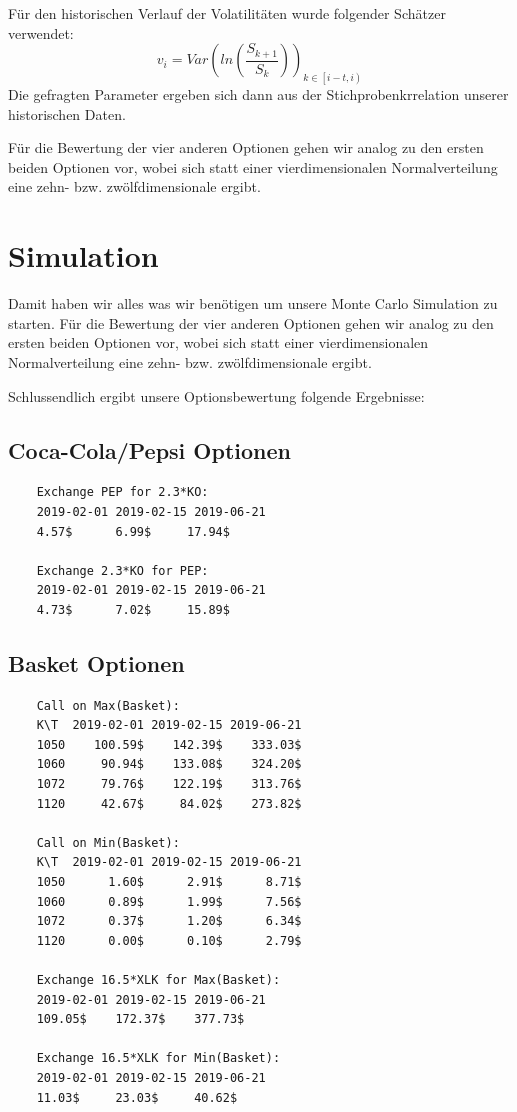 \documentclass[12pt]{article}
\begin{document}
	Für den historischen Verlauf der Volatilitäten wurde folgender Schätzer verwendet:
	\begin{equation*}
	v_i=Var\left(ln\left(\frac{S_{k+1}}{S_k}\right)\right)_{k\in\left[i-t,i\right)}
	\end{equation*}
	Die gefragten Parameter ergeben sich dann aus der Stichprobenkrrelation unserer historischen Daten.
	
	Für die Bewertung der vier anderen Optionen gehen wir analog zu den ersten beiden Optionen vor, wobei sich statt einer vierdimensionalen Normalverteilung eine zehn- bzw. zwölfdimensionale ergibt.
	
	
	
	\section*{Simulation}
	
	Damit haben wir alles was wir benötigen um unsere Monte Carlo Simulation zu starten.
	Für die Bewertung der vier anderen Optionen gehen wir analog zu den ersten beiden Optionen vor, wobei sich statt einer vierdimensionalen Normalverteilung eine zehn- bzw. zwölfdimensionale ergibt.
	
	
	
	Schlussendlich ergibt unsere Optionsbewertung folgende Ergebnisse:
	\subsection*{Coca-Cola/Pepsi Optionen}
	
	\begin{verbatim}
	Exchange PEP for 2.3*KO:
	2019-02-01 2019-02-15 2019-06-21
	4.57$      6.99$     17.94$ 
	
	Exchange 2.3*KO for PEP:
	2019-02-01 2019-02-15 2019-06-21
	4.73$      7.02$     15.89$
	\end{verbatim}
	
	
	\subsection*{Basket Optionen}
	
	
	
	\begin{verbatim}
	Call on Max(Basket):
	K\T  2019-02-01 2019-02-15 2019-06-21
	1050    100.59$    142.39$    333.03$ 
	1060     90.94$    133.08$    324.20$ 
	1072     79.76$    122.19$    313.76$ 
	1120     42.67$     84.02$    273.82$ 
	
	Call on Min(Basket):
	K\T  2019-02-01 2019-02-15 2019-06-21
	1050      1.60$      2.91$      8.71$ 
	1060      0.89$      1.99$      7.56$ 
	1072      0.37$      1.20$      6.34$ 
	1120      0.00$      0.10$      2.79$ 
	
	Exchange 16.5*XLK for Max(Basket):
	2019-02-01 2019-02-15 2019-06-21
	109.05$    172.37$    377.73$ 
	
	Exchange 16.5*XLK for Min(Basket):
	2019-02-01 2019-02-15 2019-06-21
	11.03$     23.03$     40.62$ 
	\end{verbatim}
\end{document}
